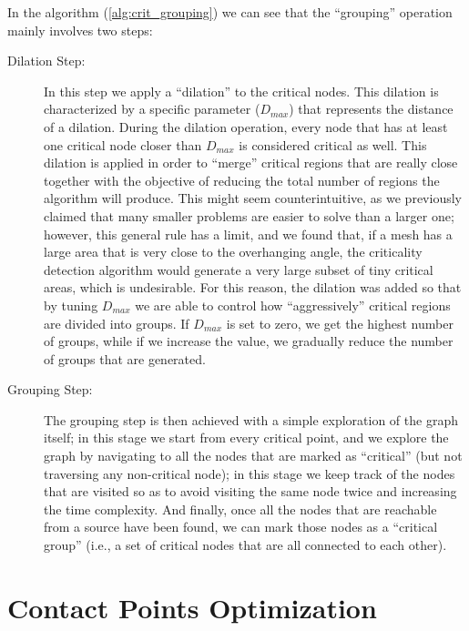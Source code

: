 \noindent
In the algorithm (\cref{alg:crit_grouping}) we can see that the ``grouping'' operation mainly
involves two steps:
\begin{description}
    \item[Dilation Step:] 
    In this step we apply a ``dilation'' to the critical nodes. This dilation
    is characterized by a specific parameter ($D_{max}$) that represents the distance of a dilation.
    During the dilation operation, every node that has at least one critical node closer than $D_{max}$
    is considered critical as well. This dilation is applied in order to ``merge'' critical regions
    that are really close together with the objective of reducing the total number of regions the algorithm
    will produce. This might seem counterintuitive, as we previously claimed that many smaller problems
    are easier to solve than a larger one; however, this general rule has a limit,
    and we found that, if a mesh has a large area that is very close to the overhanging angle, the
    criticality detection algorithm would generate a very large subset of tiny critical areas, which is undesirable.
    For this reason, the dilation was added so that by tuning $D_{max}$
    we are able to control how ``aggressively'' critical regions are divided into groups.
    If $D_{max}$ is set to zero, we get the highest number of groups, while if we increase the value,
    we gradually reduce the number of groups that are generated.
    \item[Grouping Step:] 
    The grouping step is then achieved with a simple exploration of the graph itself;
    in this stage we start from every critical point, and we explore the graph by navigating
    to all the nodes that are marked as ``critical'' (but not traversing any non-critical node);
    in this stage we keep track of the nodes that are
    visited so as to avoid visiting the same node twice and increasing the time complexity.
    And finally, once all the nodes that are reachable from a source have been found, we can mark those nodes
    as a ``critical group'' (i.e., a set of critical nodes that are all connected to each other).
\end{description}



\section{Contact Points Optimization}
\label{sec:contact_points_opt}

